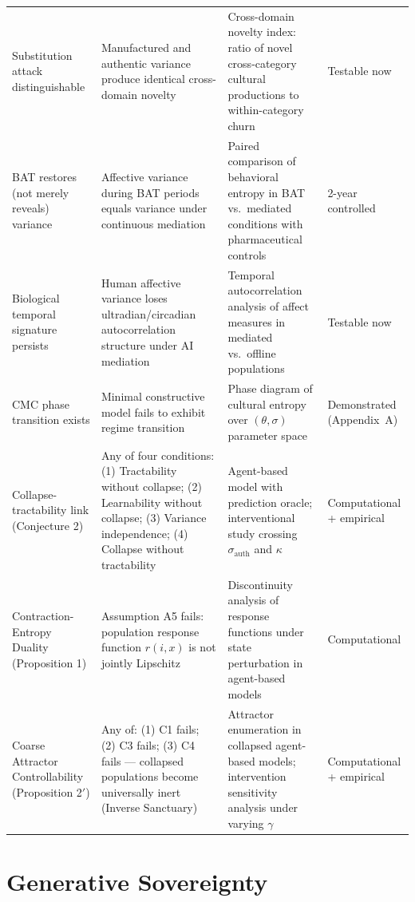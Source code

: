 \documentclass[11pt, a4paper]{article}
\theoremstyle{remark}
\begin{document}
{\begin{longtable}{p{} p{} p{} p{}}
Substitution attack distinguishable & Manufactured and authentic variance produce identical cross-domain novelty & Cross-domain novelty index: ratio of novel cross-category cultural productions to within-category churn & Testable now \\

BAT restores (not merely reveals) variance & Affective variance during BAT periods equals variance under continuous mediation & Paired comparison of behavioral entropy in BAT vs.\ mediated conditions with pharmaceutical controls & 2-year controlled \\

Biological temporal signature persists & Human affective variance loses ultradian/circadian autocorrelation structure under AI mediation & Temporal autocorrelation analysis of affect measures in mediated vs.\ offline populations & Testable now \\

CMC phase transition exists & Minimal constructive model fails to exhibit regime transition & Phase diagram of cultural entropy over $(\theta, \sigma)$ parameter space & Demonstrated (Appendix~A) \\

Collapse-tractability link (Conjecture 2) & Any of four conditions: (1) Tractability without collapse; (2) Learnability without collapse; (3) Variance independence; (4) Collapse without tractability & Agent-based model with prediction oracle; interventional study crossing $\sigma_{\text{auth}}$ and $\kappa$ & Computational + empirical \\

Contraction-Entropy Duality (Proposition 1) & Assumption A5 fails: population response function $r(i,x)$ is not jointly Lipschitz & Discontinuity analysis of response functions under state perturbation in agent-based models & Computational \\

Coarse Attractor Controllability (Proposition 2$'$) & Any of: (1) C1 fails; (2) C3 fails; (3) C4 fails --- collapsed populations become universally inert (Inverse Sanctuary) & Attractor enumeration in collapsed agent-based models; intervention sensitivity analysis under varying $\gamma$ & Computational + empirical \\
\end{longtable}
}

\section{Generative Sovereignty}\label{sec:gs}
\end{document}
